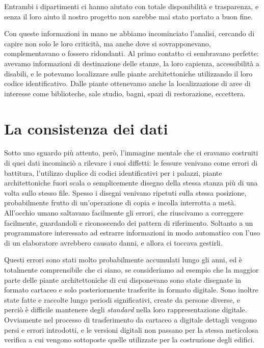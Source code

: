 \documentclass[12pt]{report}
\begin{document}
Entrambi i dipartimenti ci hanno aiutato con totale disponibilità e trasparenza, e senza il loro aiuto il nostro progetto non sarebbe mai stato portato a buon fine.

Con queste informazioni in mano ne abbiamo incominciato l'analisi, cercando di capire non solo le loro criticità, ma anche dove si sovrapponevano, complementavano o fossero ridondanti. Al primo contatto ci sembravano perfette: avevamo informazioni di destinazione delle stanze, la loro capienza, accessibilità a disabili, e le potevamo localizzare sulle piante architettoniche utilizzando il loro codice identificativo. Dalle piante ottenevamo anche la localizzazione di aree di interesse come biblioteche, sale studio, bagni, spazi di restorazione, eccettera.


\section{La consistenza dei dati}

Sotto uno sguardo più attento, però, l'immagine mentale che ci eravamo costruiti di quei dati incominciò a rilevare i suoi diffetti: le fessure venivano come errori di battitura, l'utilizzo duplice di codici identificativi per i palazzi, piante architettoniche fuori scala o semplicemente disegno della stessa stanza più di una volta sullo stesso file. Spesso i disegni venivano ripetuti sulla stessa posizione, probabilmente frutto di un'operazione di copia e incolla interrotta a metà. All'occhio umano saltavano facilmente gli errori, che riuscivamo a correggere facilmente, guardandoli e riconoscendo dei pattern di riferimento. Soltanto a un programmatore interessato ad estrarre informazioni in modo automatico con l'uso di un elaboratore avrebbero causato danni, e allora ci toccava gestirli.

Questi errori sono stati molto probabilmente accumulati lungo gli anni, ed è totalmente comprensibile che ci siano, se  consideriamo ad esempio che la maggior parte delle piante architettoniche di cui disponevano sono state disegnate in formato cartaceo e solo posteriormente trasferite in formato digitale. Sono inoltre state fatte e raccolte lungo periodi significativi, create da persone diverse, e perciò è difficile mantenere degli \textit{standard} nella loro rappresentazione digitale. Ovviamente nel processo di trasferimento da cartaceo a digitale dettagli vengono persi e errori introdotti, e le versioni digitali non passano per la stessa meticolosa verifica a cui vengono sottoposte quelle utilizzate per la costruzione degli edifici. 
\end{document}
